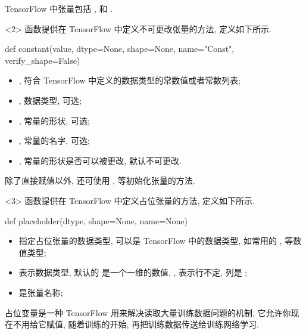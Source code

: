 \begin{frame}[fragile]{\insertsection}{\insertsubsection}
TensorFlow 中张量包括 ,  和 .

\begin{onlyenv}<2>
 函数提供在 TensorFlow 中定义不可更改张量的方法, 定义如下所示.

\begin{pythoncode}
def constant(value, dtype=None, shape=None, name="Const", verify_shape=False)
\end{pythoncode}

\begin{itemize}
\item {}, 符合 TensorFlow 中定义的数据类型的常数值或者常数列表;
\item {}, 数据类型, 可选;
\item {}, 常量的形状, 可选;
\item {}, 常量的名字, 可选;
\item {}, 常量的形状是否可以被更改, 默认不可更改.
\end{itemize}

除了直接赋值以外, 还可使用 ,  等初始化张量的方法.
\end{onlyenv}

\begin{onlyenv}<3>
 函数提供在 TensorFlow 中定义占位张量的方法, 定义如下所示.

\begin{pythoncode}
def placeholder(dtype, shape=None, name=None)
\end{pythoncode}

\begin{itemize}
\item {} 指定占位张量的数据类型, 可以是 TensorFlow 中的数据类型, 如常用的 ,  等数值类型;
\item {} 表示数据类型, 默认的  是一个一维的数值, , 表示行不定, 列是 ;
\item {} 是张量名称;
\end{itemize}

占位变量是一种 TensorFlow 用来解决读取大量训练数据问题的机制, 它允许你现在不用给它赋值, 随着训练的开始, 再把训练数据传送给训练网络学习.
\end{onlyenv}


\end{frame}
